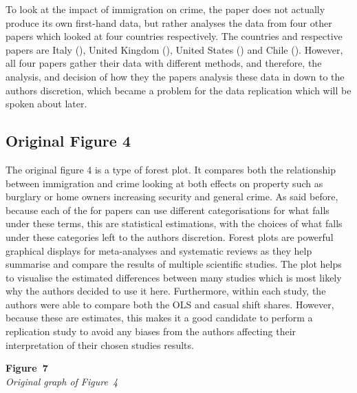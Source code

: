 \documentclass[
  man,
  floatsintext,
  longtable,
  nolmodern,
  notxfonts,
  notimes,
  colorlinks=true,linkcolor=blue,citecolor=blue,urlcolor=blue]{apa7}
\begin{document}
To look at the impact of immigration on crime, the paper does not
actually produce its own first-hand data, but rather analyses the data
from four other papers which looked at four countries respectively. The
countries and respective papers are Italy
(), United Kingdom
(), United States
() and Chile
(). However, all four
papers gather their data with different methods, and therefore, the
analysis, and decision of how they the papers analysis these data in
down to the authors discretion, which became a problem for the data
replication which will be spoken about later.

\subsection{Original Figure 4}\label{original-figure-4}

The original figure 4 is a type of forest plot. It compares both the
relationship between immigration and crime looking at both effects on
property such as burglary or home owners increasing security and general
crime. As said before, because each of the for papers can use different
categorisations for what falls under these terms, this are statistical
estimations, with the choices of what falls under these categories left
to the authors discretion. Forest plots are powerful graphical displays
for meta-analyses and systematic reviews as they help summarise and
compare the results of multiple scientific studies. The plot helps to
visualise the estimated differences between many studies which is most
likely why the authors decided to use it here. Furthermore, within each
study, the authors were able to compare both the OLS and casual shift
shares. However, because these are estimates, this makes it a good
candidate to perform a replication study to avoid any biases from the
authors affecting their interpretation of their chosen studies results.

\label{fig:1}
\textbf{Figure~7}\\
\emph{Original graph of Figure~4}
\end{document}
